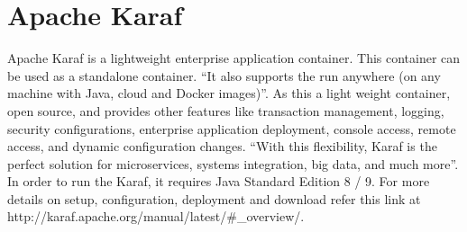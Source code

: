 \section{Apache Karaf}

Apache Karaf is a lightweight enterprise application container. This container can be used as a standalone container. 
“It also supports the run anywhere (on any machine with Java, cloud and Docker images)”\cite{hid-sp18-514-apachekaraf}. 
As this a light weight container, open source, and provides other features like transaction management\cite{karaf_transaction}, 
logging, security configurations, enterprise application deployment, console access, remote access, 
and dynamic configuration changes. “With this flexibility, Karaf is the perfect solution for microservices,
systems integration, big data, and much more”\cite{hid-sp18-514-apachekaraf}.
In order to run the Karaf, it requires Java Standard Edition 8 / 9. For more details on setup, 
configuration, deployment and download refer this link at http://karaf.apache.org/manual/latest/#_overview/.

